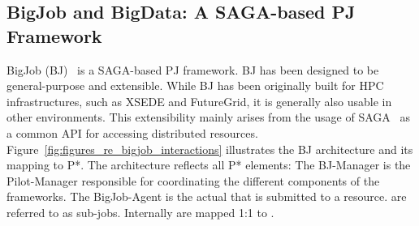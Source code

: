 \documentclass[conference]{IEEEtran}
\begin{document}
\subsection{BigJob and BigData: A SAGA-based PJ Framework}
\label{sec:bigjob_description}












BigJob (BJ)~\cite{bigjob_web,saga_bigjob_condor_cloud} is a SAGA-based PJ
framework. BJ has been designed to be general-purpose and extensible. While BJ
has been originally built for HPC infrastructures, such as XSEDE and
FutureGrid, it is generally also usable in other environments. This
extensibility mainly arises from the usage of SAGA~\cite{saga_url,ogf-gfd-90} 
as a common API for accessing distributed resources. 
Figure~\ref{fig:figures_re_bigjob_interactions} illustrates the
BJ architecture and its mapping to P*. The architecture reflects
all P* elements: The BJ-Manager is the Pilot-Manager responsible for
coordinating the different components of the frameworks. The
BigJob-Agent is the actual \pilot that is submitted to a
resource. \cus are referred to as sub-jobs. Internally \cus are mapped
1:1 to \sus.
\end{document}
